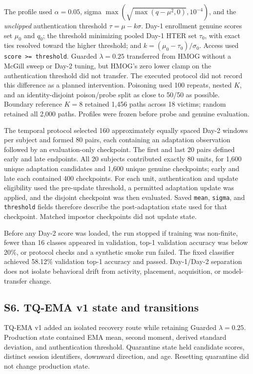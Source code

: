 \documentclass[technologies,supfile,submit,moreauthors]{Definitions/mdpi}
\begin{document}
The profile used \(\alpha=0.05\), sigma \(\max(\sqrt{\max(q-\mu^2,0)},10^{-4})\), and the \emph{unclipped} authentication threshold \(\tau=\mu-k\sigma\). Day-1 enrollment genuine scores set \(\mu_0\) and \(q_0\); the threshold minimizing pooled Day-1 HTER set \(\tau_0\), with exact ties resolved toward the higher threshold; and \(k=(\mu_0-\tau_0)/\sigma_0\). Access used \texttt{score >= threshold}. Guarded \(\lambda=0.25\) transferred from HMOG without a McGill sweep or Day-2 tuning, but HMOG's zero lower clamp on the authentication threshold did not transfer. The executed protocol did not record this difference as a planned intervention. Poisoning used 100 repeats, nested \(K\), and an identity-disjoint poison/probe split as close to 50/50 as possible. Boundary reference \(K=8\) retained 1,456 paths across 18 victims; random retained all 2,000 paths. Profiles were frozen before probe and genuine evaluation.

The temporal protocol selected 160 approximately equally spaced Day-2 windows per subject and formed 80 pairs, each containing an adaptation observation followed by an evaluation-only checkpoint. The first and last 20 pairs defined early and late endpoints. All 20 subjects contributed exactly 80 units, for 1,600 unique adaptation candidates and 1,600 unique genuine checkpoints; early and late each contained 400 checkpoints. For each unit, authentication and update eligibility used the pre-update threshold, a permitted adaptation update was applied, and the disjoint checkpoint was then evaluated. Saved \texttt{mean}, \texttt{sigma}, and \texttt{threshold} fields therefore describe the post-adaptation state used for that checkpoint. Matched impostor checkpoints did not update state.

Before any Day-2 score was loaded, the run stopped if training was non-finite, fewer than 16 classes appeared in validation, top-1 validation accuracy was below 20\%, or protocol checks and a synthetic smoke run failed. The fixed classifier achieved 58.12\% validation top-1 accuracy and passed. Day-1/Day-2 separation does not isolate behavioral drift from activity, placement, acquisition, or model-transfer change.

\subsection*{S6. TQ-EMA v1 state and transitions}\label{sm:s6}

TQ-EMA v1 added an isolated recovery route while retaining Guarded \(\lambda=0.25\). Production state contained EMA mean, second moment, derived standard deviation, and authentication threshold. Quarantine state held candidate scores, distinct session identifiers, downward direction, and age. Resetting quarantine did not change production state.
\end{document}
